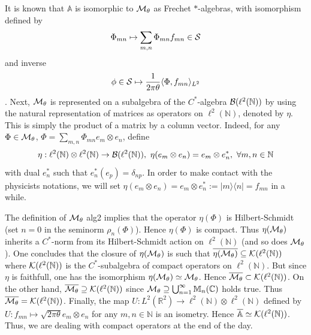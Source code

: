 \documentclass[10pt]{book}
\theoremstyle{break}
\begin{document}
It is known that ${\mathbb{A}}$ is isomorphic to ${\cal{M}}_\theta$ as Frechet $*$-algebras, with isomorphism defined by $$\Phi_{mn}\mapsto \sum_{m,n}\Phi_{mn}f_{mn}\in{\cal{S}}$$ and inverse $$\phi\in{\cal{S}}\mapsto\frac{1}{2\pi\theta}\langle \Phi,f_{mn}\rangle_{L^2}$$. Next, ${\cal{M}}_\theta$ is represented on a subalgebra of the $C^*$-algebra  ${\cal{B}}(\ell^2(\mathbb{N}))$ by using the natural representation of matrices as operators on $\ell^2(\mathbb{N})$, denoted by $\eta$. This is simply the product of a matrix by a column vector. Indeed, for any $\Phi\in{\cal{M}}_\theta$, $\Phi=\sum_{m,n}\Phi_{mn}e_m\otimes e_n$, define
\begin{equation*}
\eta:\ell^2(\mathbb{N})\otimes\ell^2(\mathbb{N})\to{\cal{B}}(\ell^2(\mathbb{N})),\ \eta(e_m\otimes e_n)=e_m\otimes e^*_n,\ \forall m,n\in\mathbb{N}
\end{equation*}
with dual $e^*_n$ such that $e^*_n(e_p)=\delta_{np}$. In order to make contact with the physicists notations, we will set $\eta(e_m\otimes e_n)=e_m\otimes e^*_n:=|m\rangle\langle n|=f_{mn}$ in a while. \par
The definition of ${\cal{M}}_\theta$ {alg2} implies that the operator $\eta(\Phi)$ is Hilbert-Schmidt (set $n=0$ in the seminorm $\rho_n(\Phi)$). Hence $\eta(\Phi)$ is compact. Thus $\eta({\cal{M}}_\theta)$ inherits a $C^*$-norm from its Hilbert-Schmidt action on $\ell^2(\mathbb{N})$ (and so does ${\cal{M}}_\theta$). One concludes that the closure of $\eta({\cal{M}}_\theta)$ is such that $\overline{\eta({\cal{M}}_\theta)}\subseteq{\cal{K}}(\ell^2(\mathbb{N}))$ where ${\cal{K}}(\ell^2(\mathbb{N}))$ is the $C^*$-subalgebra of compact operators on $\ell^2(\mathbb{N})$. But since $\eta$ is faithfull, one has the isomorphism $\eta({\cal{M}}_\theta)\simeq{\cal{M}}_\theta$. Hence $\overline{{\cal{M}}_\theta}\subset{\cal{K}}(\ell^2(\mathbb{N}))$. On the other hand, $\overline{{\cal{M}}_\theta}\supseteq{\cal{K}}(\ell^2(\mathbb{N}))$ since ${\cal{M}}_\theta\supseteq\bigcup_{n=1}^\infty{\mathbb{M}}_n(\mathbb{C})$ holds true. Thus $\overline{{\cal{M}}_\theta}={\cal{K}}(\ell^2(\mathbb{N}))$. Finally, the map $U:L^2(
\mathbb{R}^2)\to\ell^2(\mathbb{N})\otimes\ell^2(\mathbb{N})$ defined by $U:f_{mn}\mapsto {\sqrt{2\pi\theta}}e_m\otimes e_n$ for any $m,n\in\mathbb{N}$ is an isometry. Hence $\overline{{\mathbb{A}}}\simeq{\cal{K}}(\ell^2(\mathbb{N}))$. Thus, we are dealing with compact operators at the end of the day.\par
\end{document}
